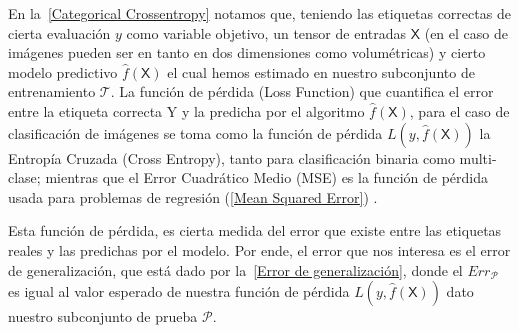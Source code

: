 En la~\autoref{Categorical Crossentropy} notamos que, teniendo las etiquetas
correctas de cierta evaluación \(y\) como variable objetivo, un tensor de
entradas \(\mathsf{X}\) (en el caso de imágenes pueden ser en tanto en dos
dimensiones como volumétricas) y cierto modelo predictivo
\(\hat{f}(\mathsf{X})\) el cual hemos estimado en nuestro subconjunto de
entrenamiento \(\mathcal{T}\). La función de pérdida (Loss Function) que
cuantifica el error entre la etiqueta correcta Y y la predicha por el algoritmo
\(\hat{f}(\mathsf{X})\), para el caso de clasificación de imágenes se toma como
la función de pérdida \(L(y , \hat{f}(\mathsf{X}))\) la Entropía Cruzada (Cross
Entropy), tanto para clasificación binaria como multi-clase; mientras que el
Error Cuadrático Medio (MSE) es la función de pérdida usada para problemas de
regresión (\autoref{Mean Squared Error}) \cite{Hastie2009}.






Esta función de pérdida, es cierta medida del error que existe entre las
etiquetas reales y las predichas por el modelo. Por ende, el error que nos
interesa es el error de generalización, que está dado por la~\autoref{Error de
generalización}, donde el \(Err_{\mathcal{P}}\) es igual al valor esperado de
nuestra función de pérdida \(L(y , \hat{f}(\mathsf{X}))\) dato nuestro
subconjunto de prueba \(\mathcal{P}\).


